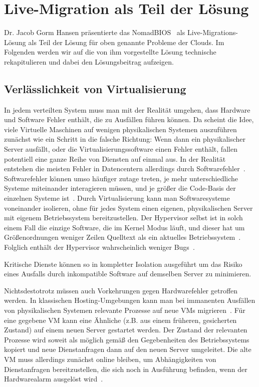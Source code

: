 \section{Live-Migration als Teil der Lösung}
\label{sec:livemigration}
Dr. Jacob Gorm Hansen präsentierte das NomadBIOS~\cite{needed} als
Live-Migrations-Lösung als Teil der Lösung für oben genannte
Probleme der Clouds. Im Folgenden werden wir auf die von ihm
vorgestellte Lösung technische rekapitulieren und dabei den
Lösungsbeitrag aufzeigen.

\subsection{Verlässlichkeit von Virtualisierung}
In jedem verteilten System muss man mit der Realität umgehen, dass
Hardware und Software Fehler enthält, die zu Ausfällen führen
können. Da scheint die Idee, viele Virtuelle Maschinen auf wenigen
physikalischen Systemen auszuführen zunächst wie ein Schritt in die
falsche Richtung: Wenn dann ein physikalischer Server ausfällt, oder
die Virtualisierungssoftware einen Fehler enthält, fallen potentiell
eine ganze Reihe von Diensten auf einmal aus. In der Realität
entstehen die meisten Fehler in Datencentern allerdings durch
Softwarefehler~\cite{tanenbaum1992modern}. Softwarefehler können umso
häufiger zutage treten, je mehr unterschiedliche Systeme miteinander
interagieren müssen, und je größer die Code-Basis der einzelnen
Systeme ist~\cite{zellerprograms}. Durch Virtualisierung kann man
Softwaresysteme voneinander isolieren, ohne für jedes System einen
eigenen, physikalischen Server mit eigenem Betriebssystem
bereitzustellen. Der Hypervisor selbst ist in solch einem Fall die
einzige Software, die im Kernel Modus läuft, und dieser hat um
Größenordnungen weniger Zeilen Quelltext als ein aktuelles
Betriebssystem~\cite{tanenbaum1992modern}. Folglich enthält der
Hypervisor wahrscheinlich weniger Bugs~\cite{zellerprograms}.

Kritische Dienste können so in kompletter Isolation ausgeführt um das
Risiko eines Ausfalls durch inkompatible Software auf demselben Server
zu minimieren.

Nichtsdestotrotz müssen auch Vorkehrungen gegen Hardwarefehler
getroffen werden. In klassischen Hosting-Umgebungen kann man bei
immanenten Ausfällen von physikalischen Systemen relevante Prozesse
auf neue VMs migrieren~\cite{hansen2004self}. Für eine gegebene VM
kann eine Ähnliche (z.B. aus einem früheren, gesicherten Zustand) auf
einem neuen Server gestartet werden. Der Zustand der relevanten
Prozesse wird soweit als möglich gemäß den Gegebenheiten des
Betriebssystems kopiert und neue Dienstanfragen dann auf den neuen
Server umgeleitet. Die alte VM muss allerdings zunächst online
bleiben, um Abhängigkeiten von Dienstanfragen bereitzustellen, die
sich noch in Ausführung befinden, wenn der Hardwarealarm ausgelöst
wird~\cite{clark2005live}.

